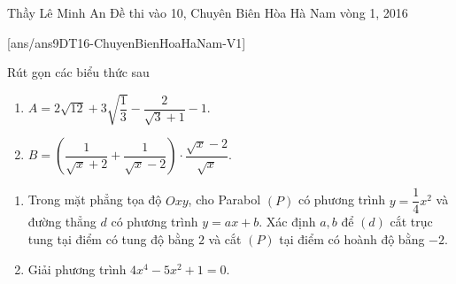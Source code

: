 \begin{name}
{Thầy  Lê Minh An}
{Đề thi vào 10, Chuyên Biên Hòa Hà Nam vòng 1, 2016}
\end{name}
\setcounter{ex}{0}
[ans/ans9DT16-ChuyenBienHoaHaNam-V1]
\begin{ex}%
Rút gọn các biểu thức sau
\begin{enumerate}
\item $A=2\sqrt{12}+3\sqrt{\dfrac{1}{3}}-\dfrac{2}{\sqrt{3}+1}-1$.
\item $B=\left(\dfrac{1}{\sqrt{x}+2}+\dfrac{1}{\sqrt{x}-2}\right)\cdot\dfrac{\sqrt{x}-2}{\sqrt{x}}$.
\end{enumerate}
\end{ex}

\begin{ex}%
\hfill
\begin{enumerate}
\item Trong mặt phẳng tọa độ $Oxy$, cho Parabol $(P)$ có phương trình $y=\dfrac{1}{4}x^2$ và đường thẳng $d$ có phương trình $y=ax+b$. Xác định $a,b$ để $(d)$ cắt trục tung tại điểm có tung độ bằng $2$ và cắt $(P)$ tại điểm có hoành độ bằng $-2$.
\item Giải phương trình $4x^4-5x^2+1=0$.
\end{enumerate}
\end{ex}

